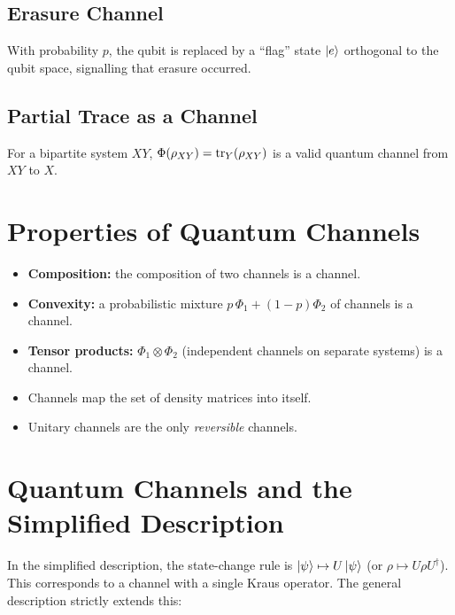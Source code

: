 \documentclass[11pt]{article}
\theoremstyle{definition}
\begin{document}
\subsection{Erasure Channel}

With probability $p$, the qubit is replaced by a ``flag'' state $\ket{e}$ orthogonal to the qubit space, signalling that erasure occurred.

\subsection{Partial Trace as a Channel}

For a bipartite system $XY$, $\Phi(\rho_{XY})=\tr_Y(\rho_{XY})$ is a valid quantum channel from $XY$ to $X$.

\section{Properties of Quantum Channels}

\begin{itemize}
    \item \textbf{Composition:} the composition of two channels is a channel.
    \item \textbf{Convexity:} a probabilistic mixture $p\,\Phi_1+(1-p)\Phi_2$ of channels is a channel.
    \item \textbf{Tensor products:} $\Phi_1\otimes\Phi_2$ (independent channels on separate systems) is a channel.
    \item Channels map the set of density matrices into itself.
    \item Unitary channels are the only \emph{reversible} channels.
\end{itemize}

\section{Quantum Channels and the Simplified Description}

In the simplified description, the state-change rule is $\ket{\psi}\mapsto U\ket{\psi}$ (or $\rho\mapsto U\rho U^\dagger$).  This corresponds to a channel with a single Kraus operator.  The general description strictly extends this:
\end{document}
